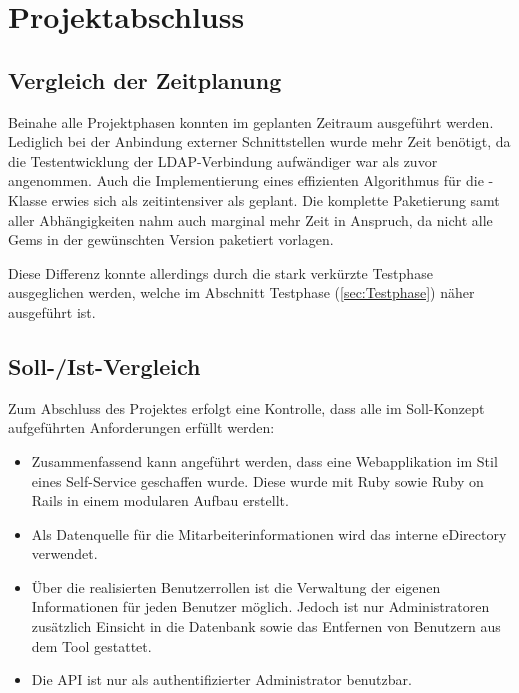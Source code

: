 \section{Projektabschluss}
\label{sec:Projektabschluss}

\subsection{Vergleich der Zeitplanung}
\label{sec:Vergleich der Zeitplanung}

Beinahe alle Projektphasen konnten im geplanten Zeitraum ausgeführt werden. Lediglich bei
der Anbindung externer Schnittstellen wurde mehr Zeit benötigt, da die Testentwicklung der
\acs{LDAP}-Verbindung aufwändiger war als zuvor angenommen. Auch die Implementierung eines
effizienten Algorithmus für die -Klasse erwies sich als zeitintensiver als geplant.
Die komplette Paketierung samt aller Abhängigkeiten nahm auch marginal mehr Zeit in Anspruch, da
nicht alle Gems in der gewünschten Version paketiert vorlagen.

Diese Differenz konnte allerdings durch die stark verkürzte Testphase ausgeglichen werden, welche im
Abschnitt Testphase (\Vgl \ref{sec:Testphase}) näher ausgeführt ist.

\pagebreak

\subsection{Soll-/Ist-Vergleich}
\label{sec:SollIstVergleich}
Zum Abschluss des Projektes erfolgt eine Kontrolle, dass alle im Soll-Konzept aufgeführten
Anforderungen erfüllt werden:
\begin{itemize}
  \item Zusammenfassend kann angeführt werden, dass eine Webapplikation im Stil eines Self-Service
  geschaffen wurde. Diese wurde mit Ruby sowie Ruby on Rails in einem modularen Aufbau erstellt.
  \item Als Datenquelle für die Mitarbeiterinformationen wird das interne eDirectory verwendet.
  \item Über die realisierten Benutzerrollen ist die Verwaltung der eigenen Informationen für jeden Benutzer
  möglich. Jedoch ist nur Administratoren zusätzlich Einsicht in die Datenbank sowie das Entfernen von
  Benutzern aus dem Tool gestattet.
  \item Die API ist nur als authentifizierter Administrator benutzbar.
\end{itemize}

